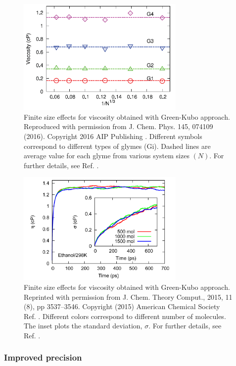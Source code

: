 \documentclass[9pt,bestpractices]{livecoms}
\begin{document}
\begin{figure}[htb!]
	\centering
	\includegraphics[width=3.2in]{MoultosFig3.png}
	\caption{Finite size effects for viscosity obtained with Green-Kubo approach. Reproduced with permission from J. Chem. Phys. 145, 074109 (2016). Copyright 2016 AIP Publishing \cite{Moultos2016}.  Different symbols correspond to different types of glymes (Gi). Dashed lines are average value for each glyme from various system sizes $(N)$. For further details, see Ref. \cite{Moultos2016}.}
	\label{fig:MoultosFig3}
\end{figure}

\begin{figure}[htb!]
	\centering
	\includegraphics[width=3.2in]{ZhangFig9.png}
	\caption{Finite size effects for viscosity obtained with Green-Kubo approach. Reprinted with permission from J. Chem. Theory Comput., 2015, 11 (8), pp 3537–3546. Copyright (2015) American Chemical Society  Ref. \cite{Zhang2015}. Different colors correspond to different number of molecules. The inset plots the standard deviation, $\sigma$. For further details, see Ref. \cite{Zhang2015}.}
	\label{fig:ZhangFig9}
\end{figure}

\subsubsection{Improved precision}	\label{sec:Viscosity:General: Improved precision}
\end{document}
